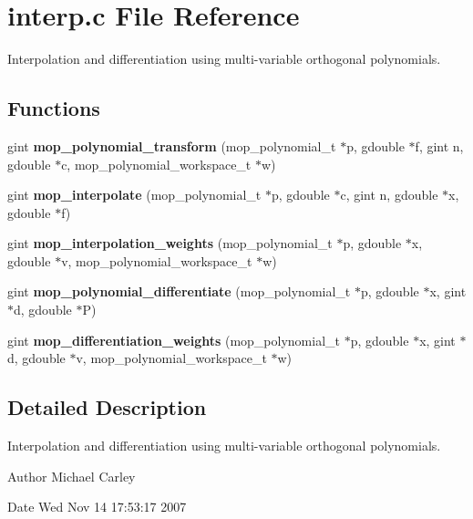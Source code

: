 \section{interp.\+c File Reference}
\label{interp_8c}


Interpolation and differentiation using multi-\/variable orthogonal polynomials.  


\subsection*{Functions}
\begin{DoxyCompactItemize}
\item 
gint {\bf mop\+\_\+polynomial\+\_\+transform} (mop\+\_\+polynomial\+\_\+t $\ast$p, gdouble $\ast$f, gint n, gdouble $\ast$c, mop\+\_\+polynomial\+\_\+workspace\+\_\+t $\ast$w)
\item 
gint {\bf mop\+\_\+interpolate} (mop\+\_\+polynomial\+\_\+t $\ast$p, gdouble $\ast$c, gint n, gdouble $\ast$x, gdouble $\ast$f)
\item 
gint {\bf mop\+\_\+interpolation\+\_\+weights} (mop\+\_\+polynomial\+\_\+t $\ast$p, gdouble $\ast$x, gdouble $\ast$v, mop\+\_\+polynomial\+\_\+workspace\+\_\+t $\ast$w)
\item 
gint {\bf mop\+\_\+polynomial\+\_\+differentiate} (mop\+\_\+polynomial\+\_\+t $\ast$p, gdouble $\ast$x, gint $\ast$d, gdouble $\ast$P)
\item 
gint {\bf mop\+\_\+differentiation\+\_\+weights} (mop\+\_\+polynomial\+\_\+t $\ast$p, gdouble $\ast$x, gint $\ast$d, gdouble $\ast$v, mop\+\_\+polynomial\+\_\+workspace\+\_\+t $\ast$w)
\end{DoxyCompactItemize}


\subsection{Detailed Description}
Interpolation and differentiation using multi-\/variable orthogonal polynomials. 

\begin{DoxyAuthor}{Author}
Michael Carley 
\end{DoxyAuthor}
\begin{DoxyDate}{Date}
Wed Nov 14 17\+:53\+:17 2007 
\end{DoxyDate}
